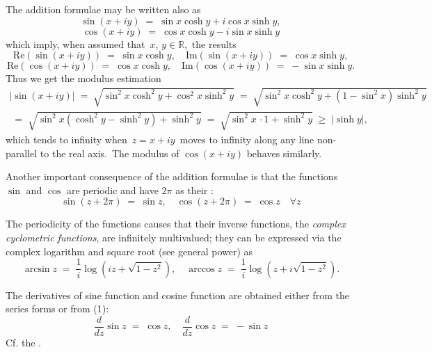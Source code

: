 \documentclass[12pt]{article}
\begin{document}
The addition formulae may be written also as
$$\sin{(x\!+\!iy)} \;=\; \sin{x}\cosh{y}+i\cos{x}\sinh{y},$$
$$\cos{(x\!+\!iy)} \;=\; \cos{x}\cosh{y}-i\sin{x}\sinh{y}$$
which imply, when assumed that\, $x,\,y\in\mathbb{R}$,\, the results
$$\mbox{Re}(\sin(x\!+\!iy)) \;=\; \sin{x}\cosh{y}, \quad 
  \mbox{Im}(\sin(x\!+\!iy)) \;=\; \cos{x}\sinh{y},$$
$$\mbox{Re}(\cos(x\!+\!iy)) \;=\; \cos{x}\cosh{y}, \quad 
  \mbox{Im}(\cos(x\!+\!iy)) \;=\; -\sin{x}\sinh{y}.$$
Thus we get the modulus estimation
$$\begin{array}{l}
|\sin(x\!+\!iy)| \;=\; \sqrt{\sin^2{x}\cosh^2{y}+\cos^2{x}\sinh^2{y}} \;=\; 
\sqrt{\sin^2{x}\cosh^2{y}+(1-\sin^2{x})\sinh^2{y}}\\ \;=\; 
\sqrt{\sin^2{x}(\cosh^2{y}-\sinh^2{y})+\sinh^2{y}} \;=\;
\sqrt{\sin^2{x}\,\cdot 1 +\sinh^2{y}} \;\ge\; |\sinh{y}|,
\end{array}$$
which tends to infinity when\, $z = x\!+\!iy$\, moves to infinity along any line non-parallel to the real axis.\, The modulus of $\cos(x\!+\!iy)$ behaves similarly.

Another important consequence of the addition formulae is that the functions $\sin$ and $\cos$ are periodic and have $2\pi$ as their 
:
$$\sin{(z\!+\!2\pi)} \;=\; \sin{z},\quad \cos{(z\!+\!2\pi)} \;=\; \cos{z} \quad \forall z$$

The periodicity of the functions causes that their inverse functions, the {\em complex cyclometric functions}, are infinitely multivalued; they can be expressed via the complex logarithm and square root (see general power) as
$$\arcsin{z} \;=\; \frac{1}{i}\log(iz\!+\!\sqrt{1\!-\!z^2}), \quad
  \arccos{z} \;=\; \frac{1}{i}\log(z\!+\!i\sqrt{1\!-\!z^2}).$$

The derivatives of sine function and cosine function are obtained either from the series forms or from (1):
$$\frac{d}{dz}\sin{z} \;=\; \cos{z}, \quad \frac{d}{dz}\cos{z} \;=\; -\sin{z}$$
Cf. the .
\end{document}
